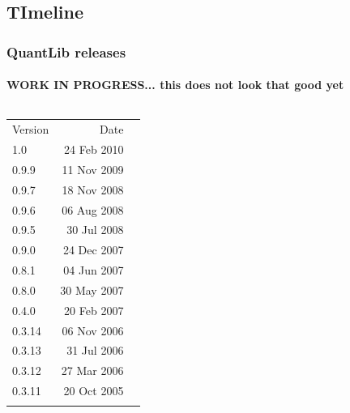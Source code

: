 \documentclass[compress]{beamer}
\begin{document}
\subsection{TImeline}
\begin{frame}
  \frametitle{QuantLib releases}
  \framesubtitle{WORK IN PROGRESS... this does not look that good yet}

  \begin{columns}
    \begin{column}{1.25in}
      \scriptsize
      \begin{tabular}{lrl}
        Version & Date &\\ 
        1.0   & 24 Feb 2010 & \\
        0.9.9 & 11 Nov 2009 & \\
        0.9.7 & 18 Nov 2008 & \\
        0.9.6 & 06 Aug 2008 & \\
        0.9.5 & 30 Jul 2008 & \\
        0.9.0 & 24 Dec 2007 & \\
        0.8.1 & 04 Jun 2007 & \\
        0.8.0 & 30 May 2007 & \\
        0.4.0 & 20 Feb 2007 & \\
        0.3.14& 06 Nov 2006 & \\
        0.3.13& 31 Jul 2006 & \\
        0.3.12& 27 Mar 2006 & \\
        0.3.11& 20 Oct 2005 & \\
        \phantom{X} & & 
      \end{tabular}
    \end{column}

    \begin{column}{0.25in}
      \phantom{XX}  %
    \end{column}


\end{columns}
\end{frame}
\end{document}
